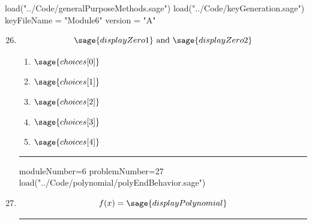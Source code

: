 \documentclass[14pt]{article}
\newcommand{\litem}[1]{\item#1\hspace*{-1cm}\rule{\textwidth}{0.4pt}}
\begin{document}
\pagestyle{fancy}

\begin{sagesilent}
load("../Code/generalPurposeMethods.sage")
load("../Code/keyGeneration.sage")
keyFileName = "Module6"
version = "A"
\end{sagesilent}

\begin{enumerate}
\setcounter{enumi}{25}


\begin{sagesilent}
moduleNumber=6
problemNumber=26
load("../Code/polynomial/constructPolyComplex.sage")
\end{sagesilent}

\litem{	

	\[ \sage{displayZero1} \text{ and } \sage{displayZero2} \]

	\begin{enumerate}[label=\Alph*.]
		\item \( \sage{choices[0]} \)
		\item \( \sage{choices[1]} \)
		\item \( \sage{choices[2]} \)
		\item \( \sage{choices[3]} \)
		\item \( \sage{choices[4]} \)
	\end{enumerate}
}

\begin{sagesilent}
moduleNumber=6
problemNumber=27
load("../Code/polynomial/polyEndBehavior.sage")
\end{sagesilent}

\litem{ 

	\[ f(x) = \sage{displayPolynomial} \]

}
\end{enumerate}
\end{document}
